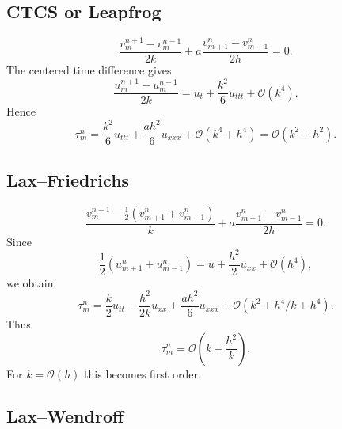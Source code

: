 \documentclass[11pt]{article}
\newcommand{\Oh}{\mathcal{O}}
\begin{document}
\subsection{CTCS or Leapfrog}

\begin{equation}
    \frac{v_m^{n+1}-v_m^{n-1}}{2k}
    +a\frac{v_{m+1}^n-v_{m-1}^n}{2h}=0.
\end{equation}
The centered time difference gives
\begin{equation}
    \frac{u_m^{n+1}-u_m^{n-1}}{2k}
    =
    u_t+\frac{k^2}{6}u_{ttt}+\Oh(k^4).
\end{equation}
Hence
\begin{equation}
    \tau_m^n
    =
    \frac{k^2}{6}u_{ttt}
    +\frac{a h^2}{6}u_{xxx}
    +\Oh(k^4+h^4)
    =
    \Oh(k^2+h^2).
\end{equation}

\subsection{Lax--Friedrichs}

\begin{equation}
    \frac{v_m^{n+1}-\frac12(v_{m+1}^n+v_{m-1}^n)}{k}
    +a\frac{v_{m+1}^n-v_{m-1}^n}{2h}=0.
\end{equation}
Since
\begin{equation}
    \frac12(u_{m+1}^n+u_{m-1}^n)
    =
    u+\frac{h^2}{2}u_{xx}+\Oh(h^4),
\end{equation}
we obtain
\begin{equation}
    \tau_m^n
    =
    \frac{k}{2}u_{tt}
    -\frac{h^2}{2k}u_{xx}
    +\frac{a h^2}{6}u_{xxx}
    +\Oh(k^2+h^4/k+h^4).
\end{equation}
Thus
\begin{equation}
    \tau_m^n=\Oh\left(k+\frac{h^2}{k}\right).
\end{equation}
For $k=\Oh(h)$ this becomes first order.

\subsection{Lax--Wendroff}
\end{document}
